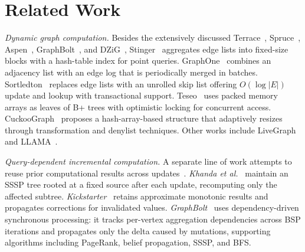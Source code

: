 \section{Related Work}
\label{sec: related work}

\textit{Dynamic graph computation.}
Besides the extensively discussed Terrace~\cite{pandey2021terrace},
Spruce~\cite{shi2024spruce}, Aspen~\cite{dhulipala2019low},
GraphBolt~\cite{mariappan2019graphbolt}, and DZiG~\cite{mariappan2021dzig},
Stinger~\cite{ediger2012stinger} aggregates edge lists into
fixed-size blocks with a hash-table index for point queries.
GraphOne~\cite{kumar2020graphone} combines an adjacency list with
an edge log that is periodically merged in batches.
Sortledton~\cite{fuchs2023sortledton} replaces edge lists with an
unrolled skip list offering $O(\log|E|)$ update and lookup with
transactional support.
Teseo~\cite{de2021teseo} uses packed memory arrays as leaves of
B+ trees with optimistic locking for concurrent access.
CuckooGraph~\cite{fan2025cuckoograph} proposes a hash-array-based
structure that adaptively resizes through transformation and denylist
techniques.
Other works include LiveGraph~\cite{zhu2019livegraph} and
LLAMA~\cite{macko2015llama}.



\textit{Query-dependent incremental computation.}
A separate line of work attempts to reuse prior computational results
across updates~\cite{besta2021practice,ramalingam1996computational}.
\textit{Khanda et al.}~\cite{khanda2021parallel} maintain an SSSP
tree rooted at a fixed source after each update, recomputing only the
affected subtree.
\textit{Kickstarter}~\cite{vora2017kickstarter} retains approximate monotonic
results and propagates corrections for invalidated values.
\textit{GraphBolt}~\cite{mariappan2019graphbolt} uses dependency-driven
synchronous processing: it tracks per-vertex aggregation dependencies across
BSP iterations and propagates only the delta caused by mutations, supporting
algorithms including PageRank, belief propagation, SSSP, and BFS.

